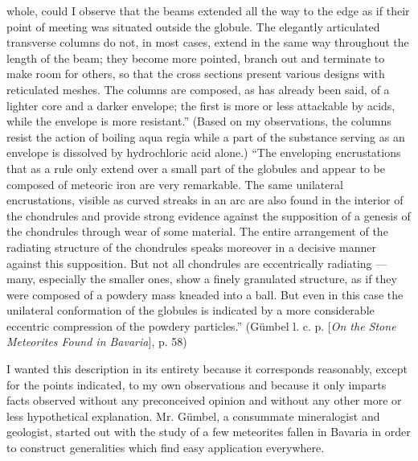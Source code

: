 \documentclass[a4paper, 12pt, oneside]{article}
\begin{document}
whole, could I observe that the beams extended all the way to the edge as if their point of meeting was situated outside the globule. The elegantly articulated transverse columns do not, in most cases, extend in the same way throughout the length of the beam; they become more pointed, branch out and terminate to make room for others, so that the cross sections present various designs with reticulated meshes. The columns are composed, as has already been said, of a lighter core and a darker envelope; the first is more or less attackable by acids, while the envelope is more resistant.'' (Based on my observations, the columns resist the action of boiling aqua regia while a part of the substance serving as an envelope is dissolved by hydrochloric acid alone.) ``The enveloping encrustations that as a rule only extend over a small part of the globules and appear to be composed of meteoric iron are very remarkable. The same unilateral encrustations, visible as curved streaks in an arc are also found in the interior of the chondrules and provide strong evidence against the supposition of a genesis of the chondrules through wear of some material. The entire arrangement of the radiating structure of the chondrules speaks moreover in a decisive manner against this supposition. But not all chondrules are eccentrically radiating --- many, especially the smaller ones, show a finely granulated structure, as if they were composed of a powdery mass kneaded into a ball. But even in this case the unilateral conformation of the globules is indicated by a more considerable eccentric compression of the powdery particles.'' (Gümbel l. c. p. [\emph{On the Stone Meteorites Found in Bavaria}], p. 58)

I wanted this description in its entirety because it corresponds reasonably, except for the points indicated, to my own observations and because it only imparts facts observed without any preconceived opinion and without any other more or less hypothetical explanation. Mr. Gümbel, a consummate mineralogist and geologist, started out with the study of a few meteorites fallen in Bavaria in order to construct generalities which find easy application everywhere.
\end{document}
